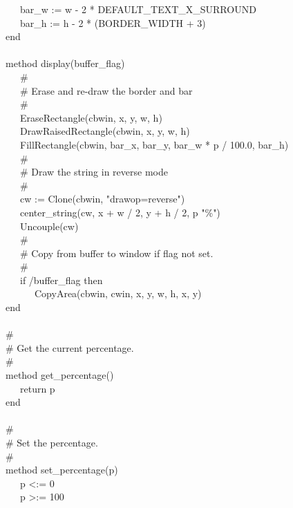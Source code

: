 {\>   \ \ \ bar\_w := w - 2 * DEFAULT\_TEXT\_X\_SURROUND \\
\>   \ \ \ bar\_h := h - 2 * (BORDER\_WIDTH + 3)  \\
\>   end \\
\ \\
\>   method display(buffer\_flag) \\
\>   \ \ \ \# \\
\>   \ \ \ \# Erase and re-draw the border and bar \\
\>   \ \ \ \# \\
\>   \ \ \ EraseRectangle(cbwin, x, y, w, h) \\
\>   \ \ \ DrawRaisedRectangle(cbwin, x, y, w,
h) \\
\>   \ \ \ FillRectangle(cbwin, bar\_x, bar\_y,
bar\_w * p / 100.0, bar\_h) \\
\>   \ \ \ \# \\
\>   \ \ \ \# Draw the string in reverse mode \\
\>   \ \ \ \# \\
\>   \ \ \ cw := Clone(cbwin,
"drawop=reverse") \\
\>   \ \ \ center\_string(cw, x + w / 2, y + h / 2,
p {\textbar}{\textbar} "\%") \\
\>   \ \ \ Uncouple(cw) \\
\>   \ \ \ \# \\
\>   \ \ \ \# Copy from buffer to window if flag not set. \\
\>   \ \ \ \# \\
\>   \ \ \ if /buffer\_flag then \\
\>   \ \ \ \ \ \ CopyArea(cbwin, cwin, x, y,
w, h, x, y) \\
\>   end \\
\ \\
\>   \# \\
\>   \# Get the current percentage. \\
\>   \# \\
\>   method get\_percentage() \\
\>   \ \ \ return p \\
\>   end \\
\ \\
\>   \# \\
\>   \# Set the percentage. \\
\>   \# \\
\>   method set\_percentage(p) \\
\>   \ \ \ p {\textless}:= 0 \\
\>   \ \ \ p {\textgreater}:= 100 \\
}
